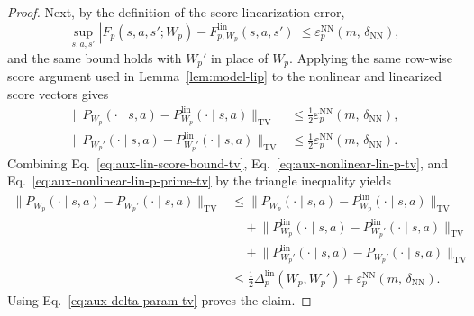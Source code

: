 \documentclass[10pt]{article} %
\theoremstyle{plain}
\theoremstyle{definition}
\theoremstyle{remark}
\begin{document}
\begin{proof}
Next, by the definition of the score-linearization error,
\[
\sup_{s,a,s'}\left| F_p(s,a,s';W_p)-F_{p,W_p}^{\mathrm{lin}}(s,a,s') \right| \le \varepsilon_{p}^{\mathrm{NN}}(m,\,\delta_{\mathrm{NN}}),
\]
and the same bound holds with \(W_p'\) in place of \(W_p\). Applying the same row-wise score argument used in Lemma~\ref{lem:model-lip} to the nonlinear and linearized score vectors gives
\begin{align}
\bigl\|P_{W_p}(\cdot\mid s,a)-P_{W_p}^{\mathrm{lin}}(\cdot\mid s,a)\bigr\|_{\mathrm{TV}}
&\le \frac{1}{2}\varepsilon_{p}^{\mathrm{NN}}(m,\,\delta_{\mathrm{NN}}),
\label{eq:aux-nonlinear-lin-p-tv}\\
\bigl\|P_{W_p'}(\cdot\mid s,a)-P_{W_p'}^{\mathrm{lin}}(\cdot\mid s,a)\bigr\|_{\mathrm{TV}}
&\le \frac{1}{2}\varepsilon_{p}^{\mathrm{NN}}(m,\,\delta_{\mathrm{NN}}).
\label{eq:aux-nonlinear-lin-p-prime-tv}
\end{align}
Combining Eq.~\ref{eq:aux-lin-score-bound-tv}, Eq.~\ref{eq:aux-nonlinear-lin-p-tv}, and Eq.~\ref{eq:aux-nonlinear-lin-p-prime-tv} by the triangle inequality yields
\begin{align*}
\bigl\|P_{W_p}(\cdot\mid s,a)-P_{W_p'}(\cdot\mid s,a)\bigr\|_{\mathrm{TV}}
&\le \bigl\|P_{W_p}(\cdot\mid s,a)-P_{W_p}^{\mathrm{lin}}(\cdot\mid s,a)\bigr\|_{\mathrm{TV}} \\
&\quad+ \bigl\|P_{W_p}^{\mathrm{lin}}(\cdot\mid s,a)-P_{W_p'}^{\mathrm{lin}}(\cdot\mid s,a)\bigr\|_{\mathrm{TV}} \\
&\quad+ \bigl\|P_{W_p'}^{\mathrm{lin}}(\cdot\mid s,a)-P_{W_p'}(\cdot\mid s,a)\bigr\|_{\mathrm{TV}}\\
&\le \frac{1}{2}\Delta_p^{\mathrm{lin}}(W_p,W_p')+\varepsilon_{p}^{\mathrm{NN}}(m,\,\delta_{\mathrm{NN}}).
\end{align*}
Using Eq.~\ref{eq:aux-delta-param-tv} proves the claim.


\end{proof}
\end{document}
